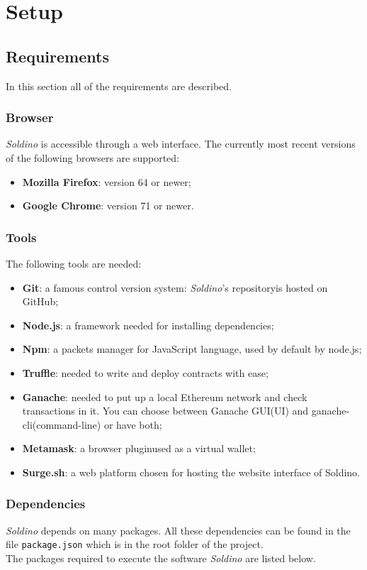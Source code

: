\section{Setup} 
\subsection{Requirements}
In this section all of the requirements are described.
\subsubsection{Browser}
\textit{Soldino} is accessible through a web interface. The currently most 
recent versions of the following browsers are supported:
\begin{itemize}
	\item \textbf{Mozilla Firefox}: version 64 or newer;
	\item \textbf{Google Chrome}: version 71 or newer.
\end{itemize}

\subsubsection{Tools}
The following tools are needed:
\begin{itemize}
	\item \textbf{Git}: a famous control version system: \textit{Soldino}'s 
	repository\glosp is hosted on GitHub\glo;
	\item \textbf{Node.js\glo}: a framework needed for installing dependencies;
	\item \textbf{Npm\glo}: a packets manager for JavaScript language, used by default by node.js;
	\item \textbf{Truffle\glo}: needed to write and deploy contracts with ease;
	\item \textbf{Ganache\glo}: needed to put up a local Ethereum network and check 
	transactions in it. You can choose between Ganache GUI(UI) and ganache-cli(command-line) or have both;
	\item \textbf{Metamask\glo}: a browser plugin\glosp used as a virtual wallet;
	\item \textbf{Surge.sh\glo}: a web platform chosen for hosting the website 
	interface of Soldino.
\end{itemize}

\subsubsection{Dependencies}
\textit{Soldino} depends on many packages. All these dependencies can be found 
in the file \texttt{package.json} which is in the root folder of the project.\\
The packages required to execute the software \textit{Soldino} are listed below.\\

